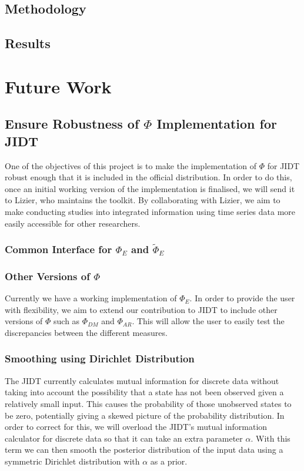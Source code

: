 \documentclass[a4paper,11pt]{article}
\begin{document}
\subsection{Methodology}
\subsection{Results}

\section{Future Work} \label{sec:fw}

\subsection{Ensure Robustness of $\Phi$ Implementation for JIDT}
\label{sec:fw:jidt}

One of the objectives of this project is to make the implementation of $\Phi$ for JIDT robust enough that it is included in the official distribution. In order to do this, once an initial working version of the implementation is finalised, we will send it to Lizier, who maintains the toolkit. By collaborating with Lizier, we aim to make conducting studies into integrated information using time series data more easily accessible for other researchers.

\subsubsection{Common Interface for $\Phi_E$ and $\widetilde{\Phi}_E$}

\subsubsection{Other Versions of $\Phi$}
Currently we have a working implementation of $\Phi_{E}$. In order to provide the user with flexibility, we aim to extend our contribution to JIDT to include other versions of $\Phi$ such as $\Phi_{DM}$ and $\Phi_{AR}$. This will allow the user to easily test the discrepancies between the different measures.

\subsubsection{Smoothing using Dirichlet Distribution}
The JIDT currently calculates mutual information for discrete data without taking into account the possibility that a state has not been observed given a relatively small input. This causes the probability of those unobserved states to be zero, potentially giving a skewed picture of the probability distribution. In order to correct for this, we will overload the JIDT's mutual information calculator for discrete data so that it can take an extra parameter $\alpha$. With this term we can then smooth the posterior distribution of the input data using a symmetric Dirichlet distribution with $\alpha$ as a prior.
\end{document}
